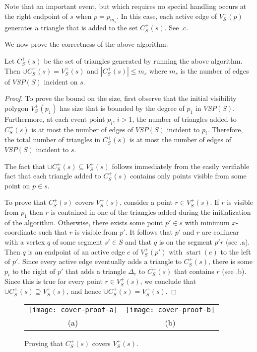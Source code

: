 \documentclass{patmorin}
\newcommand{\VSP}{\mathit{VSP}}
\DeclareMathOperator{\start}{start}
\begin{document}
Note that an important event, but which requires no special handling occurs
at the right endpoint of $s$ when $p=p_{m_s}$.  In this case, each active
edge of $V^+_S(p)$ generates a triangle that is added to the set $C^+_S(s)$.
See .c.

We now prove the correctness of the above algorithm:

\begin{lem}
Let $C^+_S(s)$ be the set of triangles generated by running the above
algorithm.  Then $\cup C^+_S(s) = V^+_S(s)$ and $|C^+_S(s)|\le m_s$ where
$m_s$ is the number of edges of $\VSP(S)$ incident on $s$.
\end{lem}

\begin{proof}
To prove the bound on the size, first observe that the initial visibility
polygon $V^+_S(p_1)$ has size that is bounded by the degree of $p_1$ in
$\VSP(S)$.  Furthermore, at each event point $p_i$, $i>1$, the number of
triangles added to $C^+_S(s)$ is at most the number of edges of $\VSP(S)$
incident to $p_i$.  Therefore, the total number of triangles in $C^+_S(s)$
is at most the number of edges of $\VSP(S)$ incident to $s$.

The fact that $\cup C^+_S(s)\subseteq V^+_S(s)$ follows immediately
from the easily verifiable fact that each triangle added to $C^+_S(s)$
contains only points visible from some point on $p\in s$.

To prove that $C^+_S(s)$ covers $V^+_S(s)$, consider a point $r\in V^+_S(s)$.  If
$r$ is visible from $p_1$ then $r$ is contained in one of the triangles
added during the initialization of the algorithm.  Otherwise, there exists
some point $p'\in s$ with minimum $x$-coordinate such that $r$ is visible
from $p'$.  It follows that $p'$ and $r$ are collinear with a vertex $q$ of
some segment $s'\in S$ and that $q$ is on the segment $p'r$ (see
.a).  Then $q$ is an endpoint of an active edge $e$ of
$V^+_S(p')$ with $\start(e)$ to the left of $p'$.  Since every active edge
eventually adds a triangle to $C^+_S(s)$, there is some $p_i$ to the right of
$p'$ that adds a triangle $\Delta_e$ to $C^+_S(s)$ that contains $r$ (see
.b).  Since this is true for every point $r\in V^+_S(s)$,
we conclude that $\cup C^+_S(s)\supseteq V^+_S(s)$, and hence $\cup C^+_S(s)=
V^+_S(s)$.  
\end{proof}

\begin{figure}
  \begin{center}
    \begin{tabular}{cc}
      \texttt{[image: cover-proof-a]} &
      \texttt{[image: cover-proof-b]} \\
      (a) & (b)
    \end{tabular}
  \end{center}
  \caption{Proving that $C^+_S(s)$ covers $V^+_S(s)$.}
\end{figure}
\end{document}
